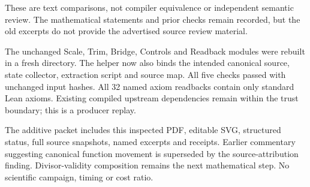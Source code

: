 \documentclass[10pt]{article}
\begin{document}
These are text comparisons, not compiler equivalence or independent semantic review. The mathematical statements and prior checks remain recorded, but the old excerpts do not provide the advertised source review material.

The unchanged Scale, Trim, Bridge, Controls and Readback modules were rebuilt in a fresh directory. The helper now also binds the intended canonical source, state collector, extraction script and source map. All five checks passed with unchanged input hashes. All 32 named axiom readbacks contain only standard Lean axioms. Existing compiled upstream dependencies remain within the trust boundary; this is a producer replay.

The additive packet includes this inspected PDF, editable SVG, structured status, full source snapshots, named excerpts and receipts. Earlier commentary suggesting canonical function movement is superseded by the source-attribution finding. Divisor-validity composition remains the next mathematical step. No scientific campaign, timing or cost ratio.
\end{document}

